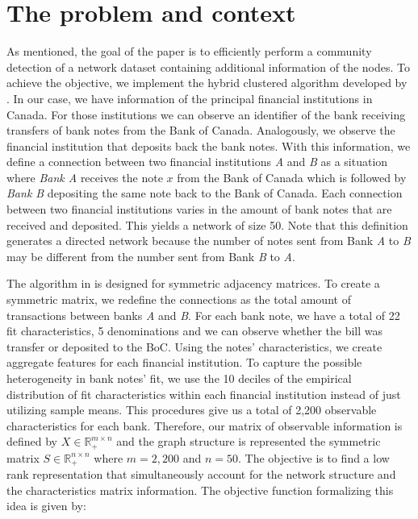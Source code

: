 \documentclass[11pt,letter]{article}%
\numberwithin{equation}{section}
\begin{document}
\section{The problem and context}

As mentioned, the goal of the paper is to efficiently perform a community detection of a network dataset containing additional information of the nodes. To achieve the objective, we implement the hybrid clustered algorithm developed by \cite{Du2017}. In our case, we have information of the principal financial institutions in Canada. For those institutions we can observe an identifier of the bank receiving transfers of bank notes from the Bank of Canada. Analogously, we observe the financial institution that deposits back the bank notes. With this information, we define a connection between two financial institutions \textit{A} and \textit{B} as a situation where \textit{Bank A} receives the note $x$ from the Bank of Canada which is followed by \textit{Bank B} depositing the same note back to the Bank of Canada. Each connection between two financial institutions varies in the amount of bank notes that are received and deposited. This yields a network of size 50. Note that this definition generates a directed network because the number of notes sent from Bank \textit{A} to \textit{B} may be different from the number sent from Bank \textit{B} to \textit{A}.

The algorithm in \cite{Du2017} is designed for symmetric adjacency matrices. To create a symmetric matrix, we redefine the connections as the total amount of transactions between banks \textit{A} and \textit{B}. For each bank note, we have a total of 22 fit characteristics, 5 denominations and we can observe whether the bill was transfer or deposited to the BoC. Using the notes' characteristics, we create aggregate features for each financial institution. To capture the possible heterogeneity in bank notes' fit, we use the 10 deciles of the empirical distribution of fit characteristics within each financial institution instead of just utilizing sample means. This procedures give us a total of 2,200 observable characteristics for each bank. Therefore, our matrix of observable information is defined by $X \in \mathbb{R}_{+}^{m \times n}$ and the graph structure is represented the symmetric matrix $S \in \mathbb{R}_{+}^{n \times n}$ where $m=2,200$ and $n=50$. The objective is to find a low rank representation that simultaneously account for the network structure and the characteristics matrix information. The objective function formalizing this idea is given by:
\end{document}
